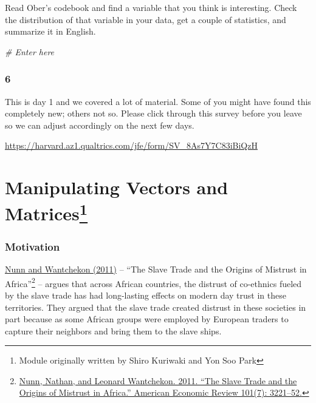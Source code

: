 \documentclass[]{book}
\newenvironment{Shaded}{\begin{snugshade}}{\end{snugshade}}
\newcommand{\CommentTok}[1]{\textcolor[rgb]{0.56,0.35,0.01}{\textit{#1}}}
\let\rmarkdownfootnote\footnote%
\def\footnote{\protect\rmarkdownfootnote}
\theoremstyle{definition}
\theoremstyle{definition}
\theoremstyle{definition}
\theoremstyle{remark}
\begin{document}
Read Ober's codebook and find a variable that you think is interesting. Check the distribution of that variable in your data, get a couple of statistics, and summarize it in English.

\begin{Shaded}
\begin{Highlighting}[]
\CommentTok{# Enter here}
\end{Highlighting}
\end{Shaded}

\hypertarget{section-5}{%
\subsection*{6}\label{section-5}}

This is day 1 and we covered a lot of material. Some of you might have found this completely new; others not so. Please click through this survey before you leave so we can adjust accordingly on the next few days.

\url{https://harvard.az1.qualtrics.com/jfe/form/SV_8As7Y7C83iBiQzH}

\hypertarget{rmatrices}{%
\chapter[Manipulating Vectors and Matrices]{\texorpdfstring{Manipulating Vectors and Matrices\footnote{Module originally written by Shiro Kuriwaki and Yon Soo Park}}{Manipulating Vectors and Matrices}}\label{rmatrices}}

\hypertarget{motivation}{%
\subsection*{Motivation}\label{motivation}}

\href{https://dash.harvard.edu/bitstream/handle/1/11986331/nunn-slave-trade.pdf}{Nunn and Wantchekon (2011)} -- ``The Slave Trade and the Origins of Mistrust in Africa''\footnote{\href{https://dash.harvard.edu/bitstream/handle/1/11986331/nunn-slave-trade.pdf}{Nunn, Nathan, and Leonard Wantchekon. 2011. ``The Slave Trade and the Origins of Mistrust in Africa.'' American Economic Review 101(7): 3221--52.}} -- argues that across African countries, the distrust of co-ethnics fueled by the slave trade has had long-lasting effects on modern day trust in these territories. They argued that the slave trade created distrust in these societies in part because as some African groups were employed by European traders to capture their neighbors and bring them to the slave ships.
\end{document}

